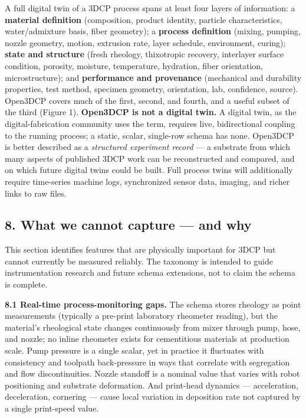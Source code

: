 \documentclass[
  11pt,
  letterpaper,
]{article}
\newcounter{none} %
\begin{document}
A full digital twin of a 3DCP process spans at least four layers of
information: a \textbf{material definition} (composition, product
identity, particle characteristics, water/admixture basis, fiber
geometry); a \textbf{process definition} (mixing, pumping, nozzle
geometry, motion, extrusion rate, layer schedule, environment, curing);
\textbf{state and structure} (fresh rheology, thixotropic recovery,
interlayer surface condition, porosity, moisture, temperature,
hydration, fiber orientation, microstructure); and \textbf{performance
and provenance} (mechanical and durability properties, test method,
specimen geometry, orientation, lab, confidence, source). Open3DCP
covers much of the first, second, and fourth, and a useful subset of the
third (Figure 1). \textbf{Open3DCP is not a digital twin.} A digital
twin, as the digital-fabrication community uses the term, requires live,
bidirectional coupling to the running process; a static, scalar,
single-row schema has none. Open3DCP is better described as a
\emph{structured experiment record} --- a substrate from which many
aspects of published 3DCP work can be reconstructed and compared, and on
which future digital twins could be built. Full process twins will
additionally require time-series machine logs, synchronized sensor data,
imaging, and richer links to raw files.

\subsection{8. What we cannot capture --- and
why}\label{what-we-cannot-capture-and-why}

This section identifies features that are physically important for 3DCP
but cannot currently be measured reliably. The taxonomy is intended to
guide instrumentation research and future schema extensions, not to
claim the schema is complete.

\textbf{8.1 Real-time process-monitoring gaps.} The schema stores
rheology as point measurements (typically a pre-print laboratory
rheometer reading), but the material's rheological state changes
continuously from mixer through pump, hose, and nozzle; no inline
rheometer exists for cementitious materials at production scale. Pump
pressure is a single scalar, yet in practice it fluctuates with
consistency and toolpath back-pressure in ways that correlate with
segregation and flow discontinuities. Nozzle standoff is a nominal value
that varies with robot positioning and substrate deformation. And
print-head dynamics --- acceleration, deceleration, cornering --- cause
local variation in deposition rate not captured by a single print-speed
value.
\end{document}
